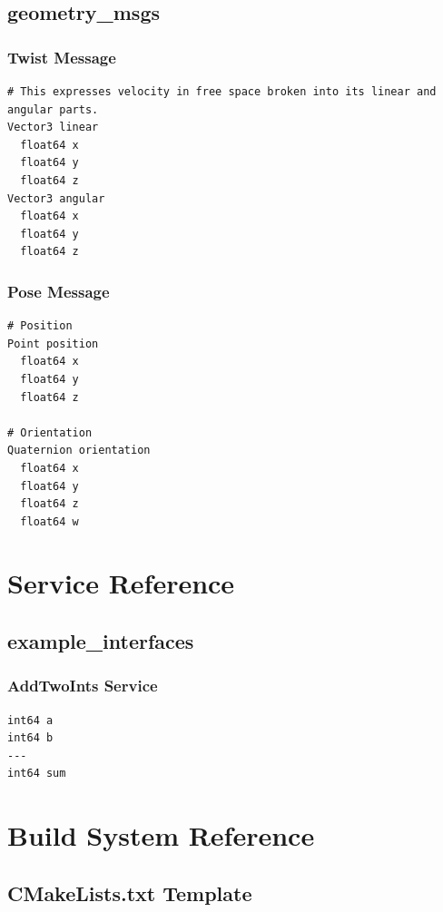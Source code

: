 \documentclass[a4paper,12pt]{book}
\begin{document}
\section{geometry\_msgs}

\subsection{Twist Message}

\begin{lstlisting}[caption=geometry\_msgs/Twist.msg]
# This expresses velocity in free space broken into its linear and angular parts.
Vector3 linear
  float64 x
  float64 y
  float64 z
Vector3 angular
  float64 x
  float64 y
  float64 z
\end{lstlisting}

\subsection{Pose Message}

\begin{lstlisting}[caption=geometry\_msgs/Pose.msg]
# Position
Point position
  float64 x
  float64 y
  float64 z

# Orientation
Quaternion orientation
  float64 x
  float64 y
  float64 z
  float64 w
\end{lstlisting}

\chapter{Service Reference}

\section{example\_interfaces}

\subsection{AddTwoInts Service}

\begin{lstlisting}[caption=example\_interfaces/srv/AddTwoInts.srv]
int64 a
int64 b
---
int64 sum
\end{lstlisting}

\chapter{Build System Reference}

\section{CMakeLists.txt Template}
\end{document}
